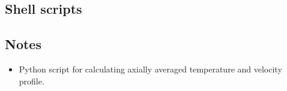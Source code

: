 \subsection{Shell scripts}
\label{tc-sh-files}
\topbar

\bottombar

\noindent
\topbar

\bottombar

\noindent
\topbar

\bottombar

\subsection{Notes}
\begin{itemize}
\item Python script for calculating axially averaged temperature and velocity profile.
      
\end{itemize}
